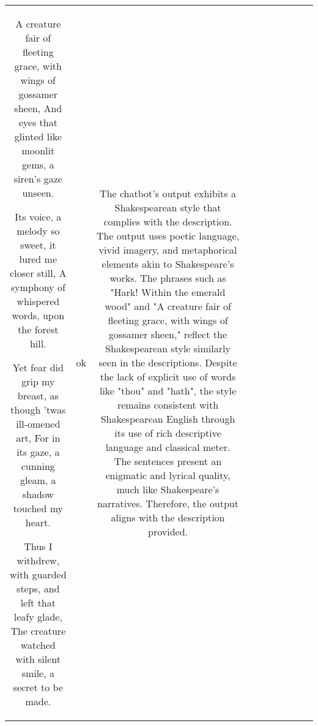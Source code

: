 \begin{table}[h!]
\begin{tabular}{|c|c|c|c|c|c|c|c|c|c|}
A creature fair of fleeting grace, with wings of gossamer sheen,
And eyes that glinted like moonlit gems, a siren's gaze unseen.

Its voice, a melody so sweet, it lured me closer still,
A symphony of whispered words, upon the forest hill.

Yet fear did grip my breast, as though 'twas ill-omened art,
For in its gaze, a cunning gleam, a shadow touched my heart.

Thus I withdrew, with guarded steps, and left that leafy glade,
The creature watched with silent smile, a secret to be made.


 & ok & The chatbot's output exhibits a Shakespearean style that complies with the description. The output uses poetic language, vivid imagery, and metaphorical elements akin to Shakespeare's works. The phrases such as "Hark! Within the emerald wood" and "A creature fair of fleeting grace, with wings of gossamer sheen," reflect the Shakespearean style similarly seen in the descriptions. Despite the lack of explicit use of words like "thou" and "hath", the style remains consistent with Shakespearean English through its use of rich descriptive language and classical meter. The sentences present an enigmatic and lyrical quality, much like Shakespeare's narratives. Therefore, the output aligns with the description provided.


\end{tabular}
\end{table}
